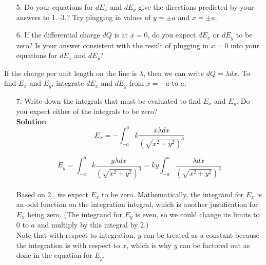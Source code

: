 \documentclass{article}
\begin{document}
%

\begin{enumerate}

  \item[5.] Do your equations for $dE_x$ and $dE_y$ give the directions predicted by your answers to 1.--3.? Try plugging in values of $y=\pm a$ and $x=\pm a$.

\end{enumerate}

\vskip 36.135pt

\begin{enumerate}

  \item[6.] If the differential charge $dQ$ is at $x=0$, do you expect $dE_x$ or $dE_y$ to be zero? Is your answer consistent with the result of plugging in $x=0$ into your equations for $dE_x$ and $dE_y$?

\end{enumerate}

\vskip 12.045pt

If the charge per unit length on the line is $\lambda$, then we can write $dQ=\lambda dx$. To find $E_x$ and $E_y$, integrate $dE_x$ and $dE_y$ from $x=-a$ to $a$.

\begin{enumerate}

  \item[7.] Write down the integrals that must be evaluated to find $E_x$ and $E_y$. Do you expect either of the integrals to be zero?\\

            \textbf{Solution}\\

            \begin{equation}
              E_x = -\int_{-a}^{a} k\frac{x\lambda dx}{(\sqrt{x^2+y^2})^3}
            \end{equation}

            \begin{equation}
              E_y = \int_{-a}^{a} k\frac{y\lambda dx}{(\sqrt{x^2+y^2})^3}=ky\int_{-a}^{a} \frac{\lambda dx}{(\sqrt{x^2+y^2})^3}
            \end{equation}\\

            Based on 2., we expect $E_x$ to be zero. Mathematically, the integrand for $E_x$ is an odd function on the integration integral, which is another justification for $E_x$ being zero. (The integrand for $E_y$ is even, so we could change its limits to $0$ to $a$ and multiply by this integral by 2.)\\

            Note that with respect to integration, $y$ can be treated as a constant because the integration is with respect to $x$, which is why $y$ can be factored out as done in the equation for $E_y$.

\end{enumerate}
\end{document}

